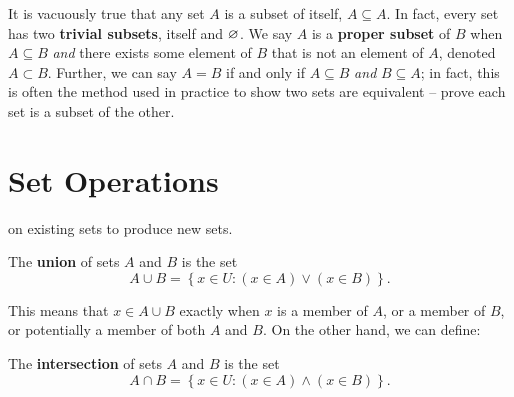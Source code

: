         It is vacuously true that any set $A$ is a subset of itself, $A \subseteq A$. In fact, every set has two \textbf{trivial subsets}, itself and $\varnothing$. We say $A$ is a \textbf{proper subset} of $B$ when $A \subseteq B$ \emph{and} there exists some element of $B$ that is not an element of $A$, denoted $A \subset B$. Further, we can say $A=B$ if and only if $A \subseteq B$ \emph{and} $B \subseteq A$; in fact, this is often the method used in practice to show two sets are equivalent -- prove each set is a subset of the other.

    \section{Set Operations}\label{sec:setops}
         on existing sets to produce new sets.

        \begin{definition}[Union]\label{def:union}
            The \textbf{union} of sets $A$ and $B$ is the set $$A\cup B = \left\{x\in U: (x\in A) \lor (x\in B)\right\}.$$
        \end{definition}

        \begin{marginfigure}
            
            \caption{The set $A \cup B$}
            \label{fig:union}
        \end{marginfigure}
        
        This means that $x \in A \cup B$ exactly when $x$ is a member of $A$, or a member of $B$, or potentially a member of both $A$ and $B$. 
        On the other hand, we can define:

        \begin{definition}[Intersection]\label{def:intersec}
            The \textbf{intersection} of sets $A$ and $B$ is the set $$A\cap B = \left\{x\in U: (x\in A) \land (x\in B)\right\}.$$
        \end{definition}

        \begin{marginfigure}
            
            \caption{The set $A \cap B$}
            \label{fig:intersection}
        \end{marginfigure} 

